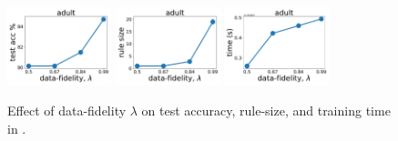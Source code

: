 \begin{figure}
	\subfloat
	{\includegraphics[width=0.27\textwidth]{figures/interpretability/relaxed-cnf/adult_test_accuracy_vary_lambda.pdf}}
	\subfloat
	{\includegraphics[width=0.27\textwidth]{figures/interpretability/relaxed-cnf/adult_rule_size_vary_lambda.pdf}}
	\subfloat
	{\includegraphics[width=0.27\textwidth]{figures/interpretability/relaxed-cnf/adult_time_vary_lambda.pdf}} 
	\\
	

	\caption[Effect of data-fidelity $ \lambda $ in {\crr}]{Effect of data-fidelity $ \lambda $ on test accuracy, rule-size, and training time in {\crr}. } 
	\label{interpretability_crr_fig:result_lambda}
\end{figure}


